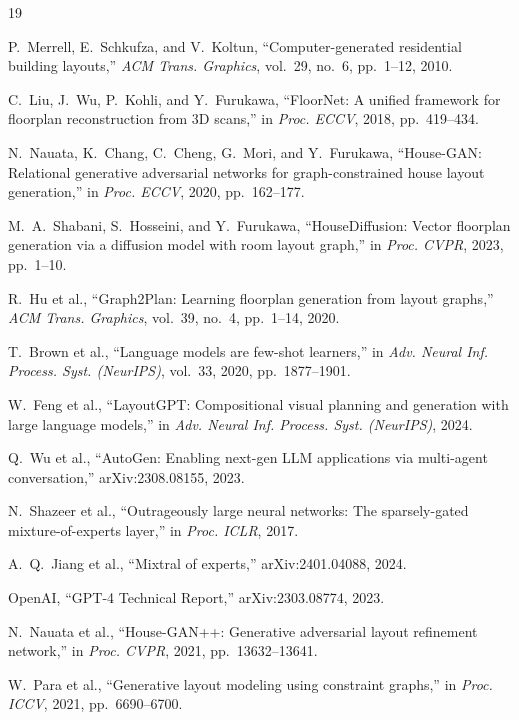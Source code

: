 \documentclass[journal]{IEEEtran}
\begin{document}
\begin{thebibliography}{19}

P.~Merrell, E.~Schkufza, and V.~Koltun,
``Computer-generated residential building layouts,''
\textit{ACM Trans. Graphics}, vol.~29, no.~6, pp.~1--12, 2010.

C.~Liu, J.~Wu, P.~Kohli, and Y.~Furukawa,
``FloorNet: A unified framework for floorplan reconstruction from 3D scans,''
in \textit{Proc. ECCV}, 2018, pp.~419--434.

N.~Nauata, K.~Chang, C.~Cheng, G.~Mori, and Y.~Furukawa,
``House-GAN: Relational generative adversarial networks for
graph-constrained house layout generation,''
in \textit{Proc. ECCV}, 2020, pp.~162--177.

M.~A.~Shabani, S.~Hosseini, and Y.~Furukawa,
``HouseDiffusion: Vector floorplan generation via a diffusion model
with room layout graph,''
in \textit{Proc. CVPR}, 2023, pp.~1--10.

R.~Hu et al.,
``Graph2Plan: Learning floorplan generation from layout graphs,''
\textit{ACM Trans. Graphics}, vol.~39, no.~4, pp.~1--14, 2020.

T.~Brown et al.,
``Language models are few-shot learners,''
in \textit{Adv. Neural Inf. Process. Syst. (NeurIPS)},
vol.~33, 2020, pp.~1877--1901.

W.~Feng et al.,
``LayoutGPT: Compositional visual planning and generation with large
language models,''
in \textit{Adv. Neural Inf. Process. Syst. (NeurIPS)}, 2024.

Q.~Wu et al.,
``AutoGen: Enabling next-gen LLM applications via multi-agent
conversation,''
arXiv:2308.08155, 2023.

N.~Shazeer et al.,
``Outrageously large neural networks: The sparsely-gated
mixture-of-experts layer,''
in \textit{Proc. ICLR}, 2017.

A.~Q.~Jiang et al.,
``Mixtral of experts,''
arXiv:2401.04088, 2024.

OpenAI,
``GPT-4 Technical Report,''
arXiv:2303.08774, 2023.

N.~Nauata et al.,
``House-GAN++: Generative adversarial layout refinement network,''
in \textit{Proc. CVPR}, 2021, pp.~13632--13641.

W.~Para et al.,
``Generative layout modeling using constraint graphs,''
in \textit{Proc. ICCV}, 2021, pp.~6690--6700.


\end{thebibliography}
\end{document}
